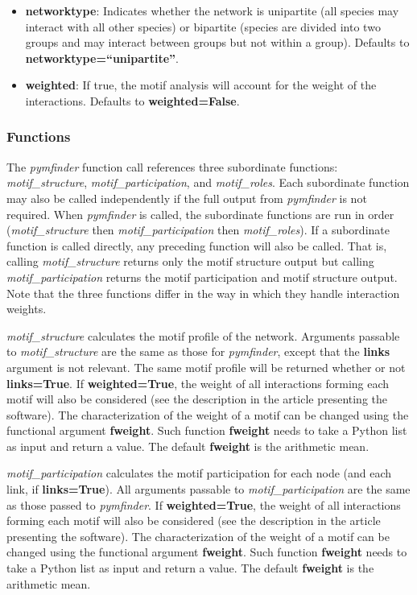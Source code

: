 \documentclass[12pt]{article}
\begin{document}
\begin{itemize}
				\item \textbf{networktype}: Indicates whether the network is unipartite (all species may interact with all other species) or bipartite (species are divided into two groups and may interact between groups but not within a group). Defaults to \textbf{networktype=``unipartite''}.
				\item \textbf{weighted}: If true, the motif analysis will account for the weight of the interactions. Defaults to \textbf{weighted=False}.
			\end{itemize}

		\subsubsection{Functions}
			The \emph{pymfinder} function call references three subordinate functions: \emph{motif\_structure}, \emph{motif\_participation}, and \emph{motif\_roles}. Each subordinate function may also be called independently if the full output from \emph{pymfinder} is not required. When \emph{pymfinder} is called, the subordinate functions are run in order (\emph{motif\_structure} then \emph{motif\_participation} then \emph{motif\_roles}). If a subordinate function is called directly, any preceding function will also be called. That is, calling \emph{motif\_structure} returns only the motif structure output but calling \emph{motif\_participation} returns the motif participation and motif structure output. Note that the three functions differ in the way in which they handle interaction weights.

			\emph{motif\_structure} calculates the motif profile of the network. Arguments passable to \emph{motif\_structure} are the same as those for \emph{pymfinder}, except that the \textbf{links} argument is not relevant. The same motif profile will be returned whether or not \textbf{links=True}. If \textbf{weighted=True}, the weight of all interactions forming each motif will also be considered (see the description in the article presenting the software). The characterization of the weight of a motif can be changed using the functional argument \textbf{fweight}. Such function \textbf{fweight} needs to take a Python list as input and return a value. The default \textbf{fweight} is the arithmetic mean.

			\emph{motif\_participation} calculates the motif participation for each node (and each link, if \textbf{links=True}). All arguments passable to \emph{motif\_participation} are the same as those passed to \emph{pymfinder}. If \textbf{weighted=True}, the weight of all interactions forming each motif will also be considered (see the description in the article presenting the software). The characterization of the weight of a motif can be changed using the functional argument \textbf{fweight}. Such function \textbf{fweight} needs to take a Python list as input and return a value. The default \textbf{fweight} is the arithmetic mean.
\end{document}
